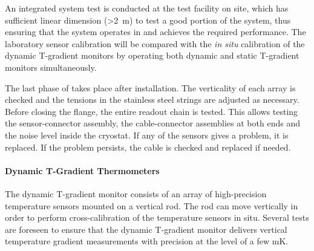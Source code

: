 An integrated system test is conducted at the \lar test facility on site, which has sufficient linear dimension (>\SI{2}{m}) to test a good portion of the system, thus ensuring that the system
operates in \lar and achieves the required performance.
The laboratory sensor calibration will be compared with the {\em in situ} calibration
of the dynamic T-gradient monitors by operating both dynamic and static T-gradient monitors simultaneously.   

The last phase of  takes place after installation. %
The verticality of each array is checked and the tensions in the stainless steel strings are adjusted as necessary.
Before closing the flange, the entire readout chain is tested.  
This allows testing the sensor-connector assembly, the cable-connector assemblies at both ends and the noise level inside the cryostat.
If any of the sensors gives a problem, it is replaced. If the problem persists, the cable is checked and replaced if needed.

\paragraph{Dynamic T-Gradient Thermometers}
\label{sec:fdgen-slow-cryo-qc-thdy}

The dynamic T-gradient monitor consists of an array of high-precision temperature sensors mounted on a vertical rod. The rod can move vertically in order to perform cross-calibration of the temperature sensors in situ. Several tests are foreseen to ensure that the dynamic T-gradient monitor delivers vertical temperature gradient measurements with precision at the level of a few \si{mK}.

